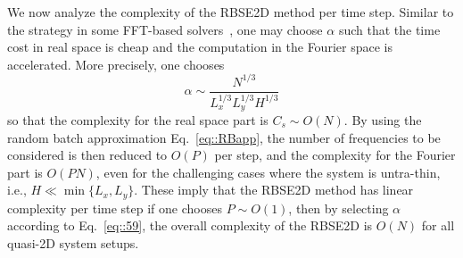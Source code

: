 We now analyze the complexity of the RBSE2D method per time step. 
Similar to the strategy in some FFT-based solvers~\cite{deserno1998mesh,lindbo2012fast}, one may choose $\alpha$ such that the time cost in real space is cheap and the computation in the Fourier space is accelerated. 
More precisely, one chooses
\begin{equation}\label{eq::59}
	\alpha\sim\frac{N^{1/3}}{L_x^{1/3}L_y^{1/3} H^{1/3}}
\end{equation}
so that the complexity for the real space part is $C_{s}\sim O(N)$. 
By using the random batch approximation Eq.~\eqref{eq::RBapp}, the number of frequencies to be considered is then reduced to $O(P)$ per step, and  the complexity for the Fourier part is $O(PN)$, even for the challenging cases where the system is untra-thin, i.e., $H \ll \min\{L_x,L_y\}$.
These imply that the RBSE2D method has linear complexity per time step if one chooses $P\sim O(1)$, then by selecting $\alpha$ according to Eq.~\eqref{eq::59}, 
the overall complexity of the RBSE2D is $O(N)$ for all quasi-2D system setups.

